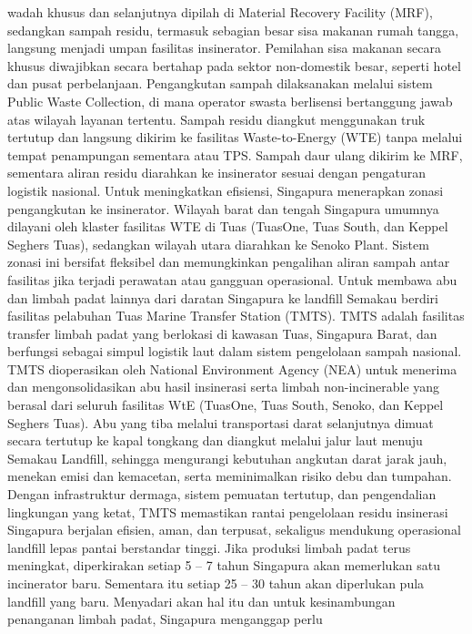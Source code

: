 \documentclass[
  letterpaper,
  DIV=11,
  numbers=noendperiod]{scrreprt}
\begin{document}
wadah khusus dan selanjutnya dipilah di Material Recovery Facility
(MRF), sedangkan sampah residu, termasuk sebagian besar sisa makanan
rumah tangga, langsung menjadi umpan fasilitas insinerator. Pemilahan
sisa makanan secara khusus diwajibkan secara bertahap pada sektor
non-domestik besar, seperti hotel dan pusat perbelanjaan. Pengangkutan
sampah dilaksanakan melalui sistem Public Waste Collection, di mana
operator swasta berlisensi bertanggung jawab atas wilayah layanan
tertentu. Sampah residu diangkut menggunakan truk tertutup dan langsung
dikirim ke fasilitas Waste-to-Energy (WTE) tanpa melalui tempat
penampungan sementara atau TPS. Sampah daur ulang dikirim ke MRF,
sementara aliran residu diarahkan ke insinerator sesuai dengan
pengaturan logistik nasional. Untuk meningkatkan efisiensi, Singapura
menerapkan zonasi pengangkutan ke insinerator. Wilayah barat dan tengah
Singapura umumnya dilayani oleh klaster fasilitas WTE di Tuas (TuasOne,
Tuas South, dan Keppel Seghers Tuas), sedangkan wilayah utara diarahkan
ke Senoko Plant. Sistem zonasi ini bersifat fleksibel dan memungkinkan
pengalihan aliran sampah antar fasilitas jika terjadi perawatan atau
gangguan operasional. Untuk membawa abu dan limbah padat lainnya dari
daratan Singapura ke landfill Semakau berdiri fasilitas pelabuhan Tuas
Marine Transfer Station (TMTS). TMTS adalah fasilitas transfer limbah
padat yang berlokasi di kawasan Tuas, Singapura Barat, dan berfungsi
sebagai simpul logistik laut dalam sistem pengelolaan sampah nasional.
TMTS dioperasikan oleh National Environment Agency (NEA) untuk menerima
dan mengonsolidasikan abu hasil insinerasi serta limbah non-incinerable
yang berasal dari seluruh fasilitas WtE (TuasOne, Tuas South, Senoko,
dan Keppel Seghers Tuas). Abu yang tiba melalui transportasi darat
selanjutnya dimuat secara tertutup ke kapal tongkang dan diangkut
melalui jalur laut menuju Semakau Landfill, sehingga mengurangi
kebutuhan angkutan darat jarak jauh, menekan emisi dan kemacetan, serta
meminimalkan risiko debu dan tumpahan. Dengan infrastruktur dermaga,
sistem pemuatan tertutup, dan pengendalian lingkungan yang ketat, TMTS
memastikan rantai pengelolaan residu insinerasi Singapura berjalan
efisien, aman, dan terpusat, sekaligus mendukung operasional landfill
lepas pantai berstandar tinggi. Jika produksi limbah padat terus
meningkat, diperkirakan setiap 5 -- 7 tahun Singapura akan memerlukan
satu incinerator baru. Sementara itu setiap 25 -- 30 tahun akan
diperlukan pula landfill yang baru. Menyadari akan hal itu dan untuk
kesinambungan penanganan limbah padat, Singapura menganggap perlu
\end{document}
